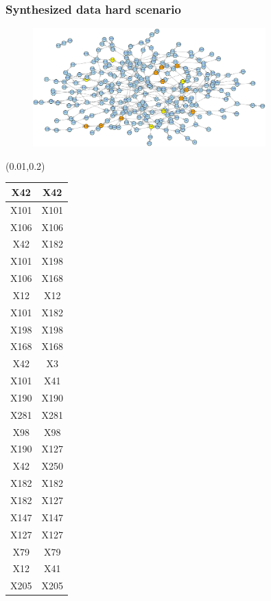\documentclass{beamer}
\newcommand{\boz}{\cellcolor{pathwaynode}}
\begin{document}
\begin{frame}[plain]
  \frametitle{Synthesized data hard scenario}
  \begin{figure}
    \includegraphics[width=0.8\textwidth]{synthesized-hard}
  \end{figure}
  \begin{textblock*}{\paperwidth}(0.01\textwidth,0.2\textheight)
    \raggedright 
    \tiny
    \begin{tabular}{| c c |}
      \hline
X42   &  X42  \\ \hline
X101   &  X101  \\ \hline
X106   &  X106  \\ \hline
X42   &  X182  \\ \hline
X101   &  X198  \\ \hline
X106   &  X168  \\ \hline
X12   &  X12  \\ \hline
X101   &  X182  \\ \hline
X198   &  X198  \\ \hline
X168   &  X168  \\ \hline
X42   &  X3  \\ \hline
X101   &  X41  \\ \hline
\boz X190   &  \boz X190  \\ \hline
X281   &  X281  \\ \hline
X98   &  X98  \\ \hline
\boz X190   &  X127  \\ \hline
X42   &  X250  \\ \hline
X182   &  X182  \\ \hline
X182   &  X127  \\ \hline
X147   &  X147  \\ \hline
X127   &  X127  \\ \hline
\boz X79   &  \boz X79  \\ \hline
X12   &  X41  \\ \hline
X205   &  X205  \\ \hline

\end{tabular}
\end{textblock*}
\end{frame}
\end{document}

